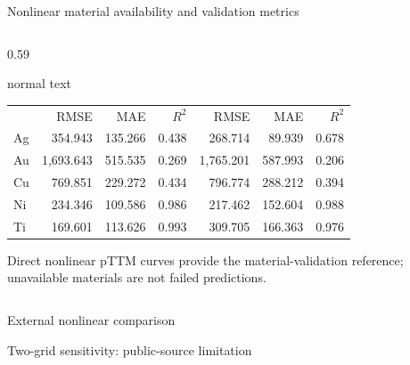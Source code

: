 \documentclass[aspectratio=169,10pt]{beamer}
\begin{document}
\begin{frame}[t]{Nonlinear material availability and validation metrics}
\begin{columns}[T,totalwidth=0.95\textwidth]
\begin{column}{0.59\textwidth}
\begin{beamercolorbox}[wd=\linewidth,sep=0.45em]{normal text}
\begin{tabular}{@{}lrrr|rrr@{}}
          \rowcolor{GVTealTint} & RMSE & MAE & \(R^2\) & RMSE & MAE & \(R^2\)\\
          Ag & 354.943 & 135.266 & 0.438 & 268.714 & 89.939 & 0.678\\
          Au & 1,693.643 & 515.535 & 0.269 & 1,765.201 & 587.993 & 0.206\\
          Cu & 769.851 & 229.272 & 0.434 & 796.774 & 288.212 & 0.394\\
          Ni & 234.346 & 109.586 & 0.986 & 217.462 & 152.604 & 0.988\\
          Ti & 169.601 & 113.626 & 0.993 & 309.705 & 166.363 & 0.976
        \end{tabular}\par
        \vspace{0.08cm}\scriptsize Direct nonlinear pTTM curves provide the material-validation reference; unavailable materials are not failed predictions.
      \end{beamercolorbox}
    \end{column}
  \end{columns}
\end{frame}

\begin{frame}[t]{External nonlinear comparison}
  \hypertarget{supp:surrogates-external-comparison}{}
  \vspace{-0.18cm}\hfill
  \hspace{0.10cm}\GVBackupIndexButton
  \vfill
  \vfill
\end{frame}

\begin{frame}[t]{Two-grid sensitivity: public-source limitation}
  \hypertarget{supp:surrogates-high-grid-thresholds}{}
  \vspace{-0.18cm}\hfill
  \hspace{0.10cm}\GVBackupIndexButton
  \vfill
  \vfill
\end{frame}
\end{document}
